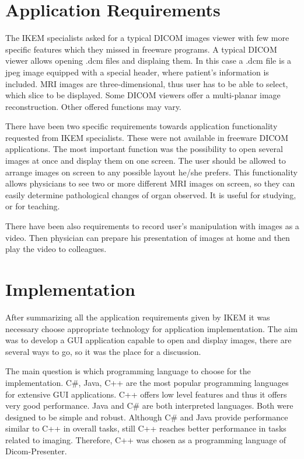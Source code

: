 \section{Application Requirements}
\label{requirements}
The IKEM specialists asked for a typical DICOM images viewer with few more specific features which they missed in freeware programs. A typical DICOM viewer allows opening .dcm files and displaing them. In this case a .dcm file is a jpeg image equipped with a special header, where patient's information is included. MRI images are three-dimensional, thus user has to be able to select, which slice to be displayed. Some DICOM viewers offer a multi-planar image reconstruction. Other offered functions may vary.

There have been two specific requirements towards application functionality requested from IKEM specialists. These were not available in freeware DICOM applications. The most important function was the possibility to open several images at once and display them on one screen. The user should be allowed to arrange images on screen to any possible layout he/she prefers. This functionality allows physicians to see two or more different MRI images on screen, so they can easily determine pathological changes of organ observed. It is useful for studying, or for teaching.

There have been also requirements to record user's manipulation with images as a video. Then physician can prepare his presentation of images at home and then play the video to colleagues.

\section{Implementation}
After summarizing all the application requirements given by IKEM it was necessary choose appropriate technology for application implementation. The aim was to develop a GUI application capable to open and display images, there are several ways to go, so it was the place for a discussion. 

The main question is which programming language to choose for the implementation. C\#, Java, C++ are the most popular programming languages for extensive GUI applications. C++ offers low level features and thus it offers very good performance. Java and C\# are both interpreted languages. Both were designed to be simple and robust. Although C\# and Java provide performance similar to C++ in overall tasks, still C++ reaches better performance in tasks related to imaging\cite{yyyy}. Therefore, C++ was chosen as a programming language of Dicom-Presenter.

